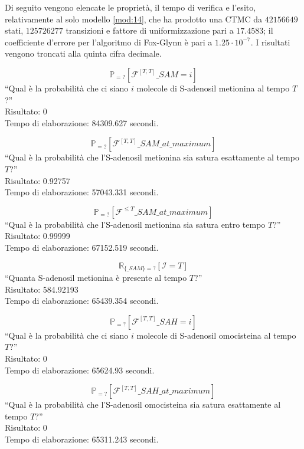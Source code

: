 Di seguito vengono elencate le propriet\`a, il tempo di verifica e l'esito, relativamente al solo modello \ref{mod:14}, che ha prodotto una CTMC da $42156649$ stati, $125726277$ transizioni e fattore di uniformizzazione pari a $17.4583$; il coefficiente d'errore per l'algoritmo di Fox-Glynn \`e pari a $1.25 \cdot 10^{-7}$.
I risultati vengono troncati alla quinta cifra decimale.

\begin{equation}
	\mathbb{P}_{=?} [ \mathcal{F}^{[T,T]} \_SAM=i ]
\end{equation}
``Qual \`e la probabilit\`a che ci siano $i$ molecole di S-adenosil metionina al tempo $T$?''\\
Risultato: 0\\
Tempo di elaborazione: 84309.627 secondi.

\begin{equation}
	\mathbb{P}_{=?} [ \mathcal{F}^{[T,T]} \_SAM\_at\_maximum ]
\end{equation}
``Qual \`e la probabilit\`a che l'S-adenosil metionina sia satura esattamente al tempo $T$?''\\
Risultato: 0.92757\\
Tempo di elaborazione: 57043.331 secondi.

\begin{equation}
	\mathbb{P}_{=?} [ \mathcal{F}^{ \leq T} \_SAM\_at\_maximum ]
\end{equation}
``Qual \`e la probabilit\`a che l'S-adenosil metionina sia satura entro tempo $T$?''\\
Risultato: 0.99999\\
Tempo di elaborazione: 67152.519 secondi.

\begin{equation}
	\mathbb{R}_{\{\_SAM\}=?} [ \mathcal{I}=T ]
\end{equation}
``Quanta S-adenosil metionina \`e presente al tempo $T$?''\\
Risultato: 584.92193\\
Tempo di elaborazione: 65439.354 secondi.

\begin{equation}
	\mathbb{P}_{=?} [ \mathcal{F}^{[T,T]} \_SAH=i ]
\end{equation}
``Qual \`e la probabilit\`a che ci siano $i$ molecole di S-adenosil omocisteina al tempo $T$?''\\
Risultato: 0\\
Tempo di elaborazione: 65624.93 secondi.

\begin{equation}
	\mathbb{P}_{=?} [ \mathcal{F}^{[T,T]} \_SAH\_at\_maximum ]
\end{equation}
``Qual \`e la probabilit\`a che l'S-adenosil omocisteina sia satura esattamente al tempo $T$?''\\
Risultato: 0\\
Tempo di elaborazione: 65311.243 secondi.

